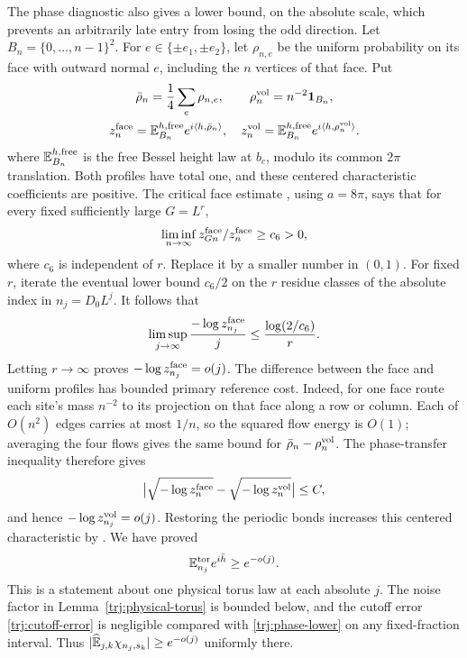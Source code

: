 The phase diagnostic also gives a lower bound, on the absolute scale,
which prevents an arbitrarily late entry from losing the odd direction.
Let \(B_n=\{0,\ldots,n-1\}^2\).  For
\(e\in\{\pm e_1,\pm e_2\}\), let \(\rho_{n,e}\) be the uniform
probability on its face with outward normal \(e\), including the
\(n\) vertices of that face.  Put
\[
 \begin{gathered}
 \bar\rho_n=\frac14\sum_e\rho_{n,e},\qquad
 \rho_n^{\rm vol}=n^{-2}\mathbf 1_{B_n},\\
 z_n^{\rm face}=\mathbb E_{B_n}^{h,\rm free}e^{i\langle h,\bar\rho_n\rangle},
 \quad
 z_n^{\rm vol}=\mathbb E_{B_n}^{h,\rm free}e^{i\langle h,\rho_n^{\rm vol}\rangle}.
 \end{gathered}
\]
where \(\mathbb E_{B_n}^{h,\rm free}\) is the free Bessel height law at
\(b_c\), modulo its common \(2\pi\) translation.  Both profiles have
total one, and these centered characteristic coefficients are positive.
The critical face estimate \cite[Equation~(2.15)]{C}, using \(a=8\pi\),
says that for every fixed sufficiently large \(G=L^r\),
\[
 \liminf_{n\to\infty}z_{Gn}^{\rm face}/z_n^{\rm face}\ge c_6>0,
\]
where \(c_6\) is independent of \(r\).  Replace it by a smaller number
in \((0,1)\).  For fixed \(r\), iterate the eventual lower bound
\(c_6/2\) on the \(r\) residue classes of the absolute index in
\(n_j=D_0L^j\).  It follows that
\[
 \limsup_{j\to\infty}\frac{-\log z_{n_j}^{\rm face}}{j}
       \le \frac{\log(2/c_6)}{r}.
\]
Letting \(r\to\infty\) proves \(-\log z_{n_j}^{\rm face}=o(j)\).
The difference between the face and uniform profiles has bounded
primary reference cost.  Indeed, for one face route each site's mass
\(n^{-2}\) to its projection on that face along a row or column.
Each of \(O(n^2)\) edges carries at most \(1/n\), so the squared flow
energy is \(O(1)\); averaging the four flows gives the same bound for
\(\bar\rho_n-\rho_n^{\rm vol}\).  The phase-transfer inequality
\cite[Equation~(2.2)]{C} therefore gives
\[
 \bigl|\sqrt{-\log z_n^{\rm face}}
       -\sqrt{-\log z_n^{\rm vol}}\bigr|\le C,
\]
and hence \(-\log z_{n_j}^{\rm vol}=o(j)\).  Restoring the periodic
bonds increases this centered characteristic by \cite[Lemma~2.2]{C}.
We have proved
\begin{equation}\label{trj:phase-lower}
              \mathbb E_{n_j}^{\rm tor} e^{i\bar h}\ge e^{-o(j)}.
\end{equation}
This is a statement about one physical torus law at each absolute \(j\).
The noise factor in Lemma~\ref{trj:physical-torus} is bounded below,
and the cutoff error \eqref{trj:cutoff-error} is negligible compared
with \eqref{trj:phase-lower} on any fixed-fraction interval.  Thus
\(|\widehat{\mathbb E}_{j,k}\chi_{n_j,s_k}|\ge e^{-o(j)}\) uniformly there.

